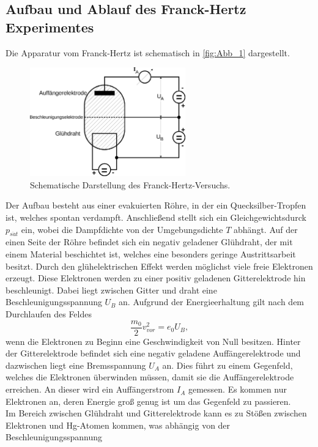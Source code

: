 \subsection{Aufbau und Ablauf des Franck-Hertz Experimentes}
\label{subsec:AufAbTheo}
Die Apparatur vom Franck-Hertz ist schematisch in \autoref{fig:Abb_1} dargestellt.
\begin{figure}[H]
    \centering
    \includegraphics[width=0.6\textwidth]{build/Abb_1.png}
    \caption{Schematische Darstellung des Franck-Hertz-Versuchs\cite{V601}.}
    \label{fig:Abb_1}
\end{figure}
Der Aufbau besteht aus einer evakuierten Röhre, in der ein Quecksilber-Tropfen ist, welches spontan verdampft. Anschließend stellt sich ein 
Gleichgewichtsdurck $p_{s\ddot{a}t}$ ein, wobei die Dampfdichte von der Umgebungsdichte $T$ abhängt.
Auf der einen Seite der Röhre befindet sich ein negativ geladener Glühdraht, der mit einem Material beschichtet ist, welches eine besonders geringe
Austrittsarbeit besitzt. Durch den glühelektrischen Effekt werden möglichst viele freie Elektronen erzeugt.
Diese Elektronen werden zu einer positiv geladenen Gitterelektrode hin beschleunigt. Dabei liegt zwischen Gitter und draht eine Beschleunigungsspannung
$U_B$ an. Aufgrund der Energieerhaltung gilt nach dem Durchlaufen des Feldes
\begin{equation*}
    \frac{m_0}{2} v^2_{vor} = e_0 U_B,
\end{equation*}
wenn die Elektronen zu Beginn eine Geschwindigkeit von Null besitzen.
Hinter der Gitterelektrode befindet sich eine negativ geladene Auffängerelektrode und dazwischen liegt eine Bremsspannung $U_A$ an.
Dies führt zu einem Gegenfeld, welches die Elektronen überwinden müssen, damit sie die Auffängerelektrode erreichen. An dieser wird ein Auffängerstrom
$I_A$ gemessen. Es kommen nur Elektronen an, deren Energie groß genug ist um das Gegenfeld zu passieren.\\
Im Bereich zwischen Glühdraht und Gitterelektrode kann es zu Stößen zwischen Elektronen und Hg-Atomen kommen, was abhängig von der Beschleunigungsspannung
